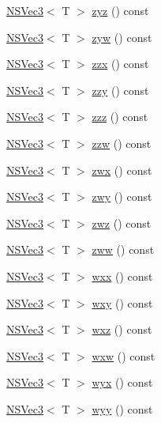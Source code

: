 \begin{DoxyCompactItemize}
\item 
\hyperlink{structNSVec3}{N\-S\-Vec3}$<$ T $>$ \hyperlink{structNSVec4_a29eb3e2b2e87a2a4b432cdbcd7f5da98}{zyz} () const 
\item 
\hyperlink{structNSVec3}{N\-S\-Vec3}$<$ T $>$ \hyperlink{structNSVec4_ab6647e7f1d86b30ccb20d4826e7b86a6}{zyw} () const 
\item 
\hyperlink{structNSVec3}{N\-S\-Vec3}$<$ T $>$ \hyperlink{structNSVec4_ab96c4613865536d8dcf7eb7b37534ce2}{zzx} () const 
\item 
\hyperlink{structNSVec3}{N\-S\-Vec3}$<$ T $>$ \hyperlink{structNSVec4_a4cd6bfc03e07c30e30aec2d6a8f0043c}{zzy} () const 
\item 
\hyperlink{structNSVec3}{N\-S\-Vec3}$<$ T $>$ \hyperlink{structNSVec4_a10ec833f4f6038b6e8f3c709523800b6}{zzz} () const 
\item 
\hyperlink{structNSVec3}{N\-S\-Vec3}$<$ T $>$ \hyperlink{structNSVec4_adb3f8d8668befe6f8f6fd6cc6afc7cad}{zzw} () const 
\item 
\hyperlink{structNSVec3}{N\-S\-Vec3}$<$ T $>$ \hyperlink{structNSVec4_ab0e107e958652d04e21cffb507e9cf75}{zwx} () const 
\item 
\hyperlink{structNSVec3}{N\-S\-Vec3}$<$ T $>$ \hyperlink{structNSVec4_aaeda690a259b730926fe49097cfab978}{zwy} () const 
\item 
\hyperlink{structNSVec3}{N\-S\-Vec3}$<$ T $>$ \hyperlink{structNSVec4_a6a8cfbc4d351510f0e9c6ed81fbd028c}{zwz} () const 
\item 
\hyperlink{structNSVec3}{N\-S\-Vec3}$<$ T $>$ \hyperlink{structNSVec4_aeaa2e853cc17916db9294533b8105bcb}{zww} () const 
\item 
\hyperlink{structNSVec3}{N\-S\-Vec3}$<$ T $>$ \hyperlink{structNSVec4_a6bbc44affeaa96c594c03bed9bf3ad3f}{wxx} () const 
\item 
\hyperlink{structNSVec3}{N\-S\-Vec3}$<$ T $>$ \hyperlink{structNSVec4_a5a30ead96d17fe5328740162a650cff0}{wxy} () const 
\item 
\hyperlink{structNSVec3}{N\-S\-Vec3}$<$ T $>$ \hyperlink{structNSVec4_af397a01a176c176683af07659f2c5cfc}{wxz} () const 
\item 
\hyperlink{structNSVec3}{N\-S\-Vec3}$<$ T $>$ \hyperlink{structNSVec4_a479387b302e51329ced502b751b10ffc}{wxw} () const 
\item 
\hyperlink{structNSVec3}{N\-S\-Vec3}$<$ T $>$ \hyperlink{structNSVec4_a0f278b5b40600ff3d8054954b54cbd8b}{wyx} () const 
\item 
\hyperlink{structNSVec3}{N\-S\-Vec3}$<$ T $>$ \hyperlink{structNSVec4_a730f53f6d0cf7da439abcd7bdb38bfba}{wyy} () const 

\end{DoxyCompactItemize}
